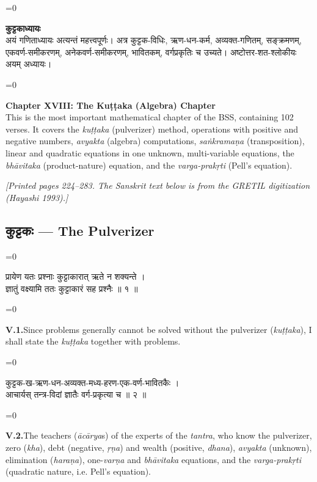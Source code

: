 \documentclass[11pt,a4paper]{article}
\newcommand{\cnote}[1]{\textcolor{notecolor}{\textit{#1}}}
\newcommand{\dev}[1]{{\devanagarifont\color{sktcolor}#1}}
\newcommand{\iast}[1]{\textit{#1}}
\newenvironment{paracol}[1]{\begingroup}{\endgroup}
\newcommand{\switchcolumn}[1][]{%
  \ifnum#1=0\relax\else\par\nobreak\vspace{0.5em}\par\nobreak\fi%
}
\begin{document}
\begin{paracol}{2}
\switchcolumn[0]
\dev{%
\textbf{कुट्टकाध्यायः}\\[0.2cm]
अयं गणिताध्यायः अत्यन्तं महत्त्वपूर्णः। अत्र कुट्टक-विधिः,
ऋण-धन-कर्म, अव्यक्त-गणितम्, सङ्क्रमणम्, एकवर्ण-समीकरणम्,
अनेकवर्ण-समीकरणम्, भावितकम्, वर्गप्रकृतिः च उच्यते।
अष्टोत्तर-शत-श्लोकीयः अयम् अध्यायः।
}

\switchcolumn[1]
\textbf{Chapter XVIII: The Kuṭṭaka (Algebra) Chapter}\\[0.2cm]
This is the most important mathematical chapter of the BSS,
containing 102 verses. It covers the \iast{kuṭṭaka} (pulverizer)
method, operations with positive and negative numbers,
\iast{avyakta} (algebra) computations, \iast{saṅkramaṇa}
(transposition), linear and quadratic equations in one unknown,
multi-variable equations, the \iast{bhāvitaka} (product-nature)
equation, and the \iast{varga-prakṛti} (Pell's equation).
\end{paracol}

\vspace{0.3cm}
\cnote{[Printed pages 224–283. The Sanskrit text below is from the GRETIL
digitization (Hayashi 1993).]}
\vspace{0.5cm}

\subsection*{\dev{कुट्टकः — The Pulverizer}}

\vspace{0.3cm}

\begin{paracol}{2}
\switchcolumn[0]
\dev{%
प्रायेण यतः प्रश्नाः कुट्टाकारात् ऋते न शक्यन्ते ।\\
ज्ञातुं वक्ष्यामि ततः कुट्टाकारं सह प्रश्नैः ॥ १ ॥
}

\switchcolumn[1]
\textbf{V.1.}\quad Since problems generally cannot be solved without
the pulverizer (\iast{kuṭṭaka}), I shall state the
\iast{kuṭṭaka} together with problems.
\end{paracol}

\vspace{0.3cm}

\begin{paracol}{2}
\switchcolumn[0]
\dev{%
कुट्टक-ख-ऋण-धन-अव्यक्त-मध्य-हरण-एक-वर्ण-भावितकैः ।\\
आचार्यस् तन्त्र-विदां ज्ञातैः वर्ग-प्रकृत्या च ॥ २ ॥
}

\switchcolumn[1]
\textbf{V.2.}\quad The teachers (\iast{ācārya}s) of the experts of
the \iast{tantra}, who know the pulverizer, zero (\iast{kha}),
debt (negative, \iast{ṛṇa}) and wealth (positive, \iast{dhana}),
\iast{avyakta} (unknown), elimination (\iast{haraṇa}),
one-\iast{varṇa} and \iast{bhāvitaka} equations, and the
\iast{varga-prakṛti} (quadratic nature, i.e. Pell's equation).
\end{paracol}
\end{document}
